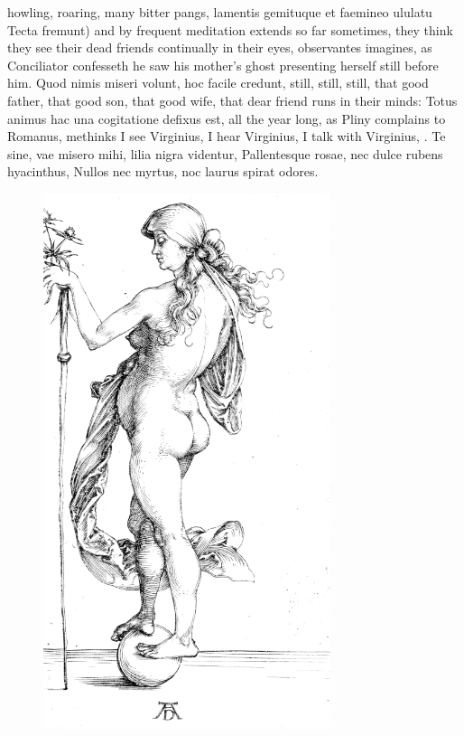 {howling, roaring, many bitter pangs, lamentis gemituque et
faemineo ululatu Tecta fremunt) and by frequent meditation extends so
far sometimes, they think they see their dead friends continually
in their eyes, observantes imagines, as Conciliator confesseth he saw
his mother's ghost presenting herself still before him. Quod nimis
miseri volunt, hoc facile credunt, still, still, still, that good
father, that good son, that good wife, that dear friend runs in their
minds: Totus animus hac una cogitatione defixus est, all the year long,
as Pliny complains to Romanus, methinks I see Virginius, I hear
Virginius, I talk with Virginius, \etc{}.
Te sine, vae misero mihi, lilia nigra videntur,
Pallentesque rosae, nec dulce rubens hyacinthus,
Nullos nec myrtus, noc laurus spirat odores.

\begin{figure}[p]
  \centering
  \includegraphics[keepaspectratio,width=0.75\textwidth]{figures/fortuna-small.jpg}
  \caption{}
  \label{fig:fortuna}
\end{figure}

}
